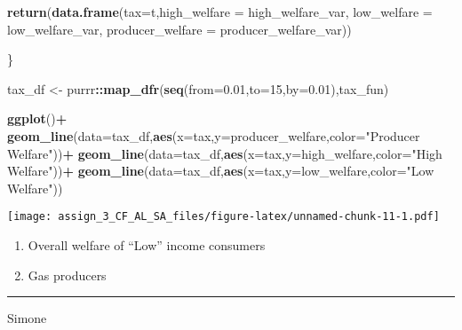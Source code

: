\documentclass[]{article}
\newenvironment{Shaded}{\begin{snugshade}}{\end{snugshade}}
\newcommand{\DataTypeTok}[1]{\textcolor[rgb]{0.13,0.29,0.53}{#1}}
\newcommand{\DecValTok}[1]{\textcolor[rgb]{0.00,0.00,0.81}{#1}}
\newcommand{\FloatTok}[1]{\textcolor[rgb]{0.00,0.00,0.81}{#1}}
\newcommand{\KeywordTok}[1]{\textcolor[rgb]{0.13,0.29,0.53}{\textbf{#1}}}
\newcommand{\NormalTok}[1]{#1}
\newcommand{\OperatorTok}[1]{\textcolor[rgb]{0.81,0.36,0.00}{\textbf{#1}}}
\newcommand{\StringTok}[1]{\textcolor[rgb]{0.31,0.60,0.02}{#1}}
\providecommand{\tightlist}{%
  \setlength{\itemsep}{0pt}\setlength{\parskip}{0pt}}
\begin{document}
\begin{Shaded}
\begin{Highlighting}[]
  \KeywordTok{return}\NormalTok{(}\KeywordTok{data.frame}\NormalTok{(}\DataTypeTok{tax=}\NormalTok{t,}\DataTypeTok{high_welfare =}\NormalTok{ high_welfare_var, }\DataTypeTok{low_welfare =}\NormalTok{ low_welfare_var, }\DataTypeTok{producer_welfare =}\NormalTok{ producer_welfare_var))}
    
\NormalTok{  \}}
  
\NormalTok{tax_df <-}\StringTok{ }\NormalTok{purrr}\OperatorTok{::}\KeywordTok{map_dfr}\NormalTok{(}\KeywordTok{seq}\NormalTok{(}\DataTypeTok{from=}\FloatTok{0.01}\NormalTok{,}\DataTypeTok{to=}\DecValTok{15}\NormalTok{,}\DataTypeTok{by=}\FloatTok{0.01}\NormalTok{),tax_fun)}
\end{Highlighting}
\end{Shaded}

\begin{Shaded}
\begin{Highlighting}[]
\KeywordTok{ggplot}\NormalTok{()}\OperatorTok{+}
\StringTok{  }\KeywordTok{geom_line}\NormalTok{(}\DataTypeTok{data=}\NormalTok{tax_df,}\KeywordTok{aes}\NormalTok{(}\DataTypeTok{x=}\NormalTok{tax,}\DataTypeTok{y=}\NormalTok{producer_welfare,}\DataTypeTok{color=}\StringTok{"Producer Welfare"}\NormalTok{))}\OperatorTok{+}
\StringTok{  }\KeywordTok{geom_line}\NormalTok{(}\DataTypeTok{data=}\NormalTok{tax_df,}\KeywordTok{aes}\NormalTok{(}\DataTypeTok{x=}\NormalTok{tax,}\DataTypeTok{y=}\NormalTok{high_welfare,}\DataTypeTok{color=}\StringTok{"High Welfare"}\NormalTok{))}\OperatorTok{+}
\StringTok{  }\KeywordTok{geom_line}\NormalTok{(}\DataTypeTok{data=}\NormalTok{tax_df,}\KeywordTok{aes}\NormalTok{(}\DataTypeTok{x=}\NormalTok{tax,}\DataTypeTok{y=}\NormalTok{low_welfare,}\DataTypeTok{color=}\StringTok{"Low Welfare"}\NormalTok{))}
\end{Highlighting}
\end{Shaded}

\texttt{[image: assign\_3\_CF\_AL\_SA\_files/figure-latex/unnamed-chunk-11-1.pdf]}

\begin{enumerate}
\def\labelenumi{\alph{enumi}.}
\setcounter{enumi}{1}
\tightlist
\item
  Overall welfare of ``Low'' income consumers
\item
  Gas producers
\end{enumerate}

\begin{center}\rule{0.5\linewidth}{0.5pt}\end{center}

Simone
\end{document}
